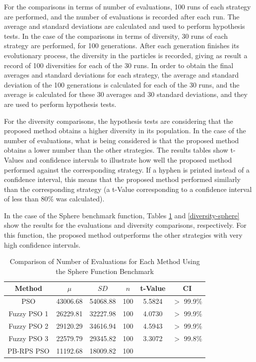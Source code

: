 For the comparisons in terms of number of evaluations, 100 runs of each strategy are performed, and the number of evaluations is recorded after each run. The average and standard deviations are calculated and used to perform hypothesis tests. In the case of the comparisons in terms of diversity, 30 runs of each strategy are performed, for 100 generations. After each generation finishes its evolutionary process, the diversity in the particles is recorded, giving as result a record of 100 diversities for each of the 30 runs. In order to obtain the final averages and standard deviations for each strategy, the average and standard deviation of the 100 generations is calculated for each of the 30 runs, and the average is calculated for these 30 averages and 30 standard deviations, and they are used to perform hypothesis tests.

For the diversity comparisons, the hypothesis tests are considering that the proposed method obtains a higher diversity in its population. In the case of the number of evaluations, what is being considered is that the proposed method obtains a lower number than the other strategies. The results tables show t-Values and confidence intervals to illustrate how well the proposed method performed against the corresponding strategy. If a hyphen is printed instead of a confidence interval, this means that the proposed method performed similarly than the corresponding strategy (a t-Value corresponding to a confidence interval of less than 80\% was calculated).

In the case of the Sphere benchmark function, Tables \ref{evaluations-sphere} and \ref{diversity-sphere} show the results for the evaluations and diversity comparisons, respectively. For this function, the proposed method outperforms the other strategies with very high confidence intervals.

\begin{table}[!t]
  \renewcommand{\arraystretch}{1.3}
  \caption{Comparison of Number of Evaluations for Each Method Using the Sphere Function Benchmark}
  \label{evaluations-sphere}
  \centering
  \begin{tabular}{|c|c|c|c|c|c|}
    \hline
    Method & $\mu$ & $SD$ & $n$ & t-Value & CI \\
    \hline
    PSO 		& 43006.68 & 54068.88 & 100 & 5.5824 & $>$ 99.9\% \\
    \hline
    Fuzzy PSO 1 & 26229.81 & 32227.98 & 100 & 4.0730  & $>$ 99.9\% \\
    \hline
    Fuzzy PSO 2 & 29120.29 & 34616.94 & 100 & 4.5943 & $>$ 99.9\% \\
    \hline
    Fuzzy PSO 3 & 22579.79 & 29345.82 & 100 & 3.3072 & $>$ 99.8\% \\
    \hline
    PB-RPS PSO  & 11192.68 & 18009.82 & 100 &  &  \\
    \hline
  \end{tabular}
\end{table}

